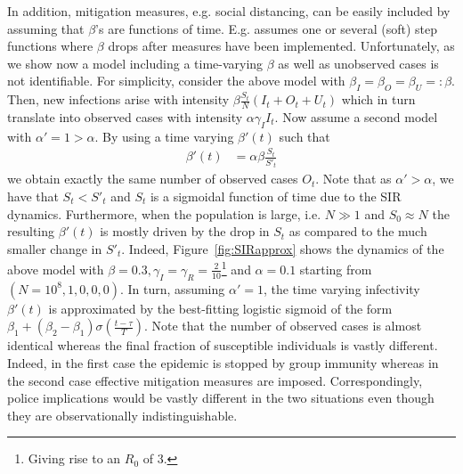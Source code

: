 \documentclass[fullpage,a4paper]{article}
\newcommand{\fig}[1]{Figure~\ref{fig:#1}}
\begin{document}
In addition, mitigation measures, e.g. social distancing, can be
easily included by assuming that $\beta$'s are functions of
time. E.g. \cite{arxiv:2004.01105} assumes one or several (soft) step
functions where $\beta$ drops after measures have been
implemented. Unfortunately, as we show now a model including a
time-varying $\beta$ as well as unobserved cases is not identifiable.
For simplicity, consider the above model with $\beta_I = \beta_O =
\beta_U =: \beta$. Then, new infections arise with intensity $\beta
\frac{S_t}{N} (I_t + O_t + U_t)$ which in turn translate into observed
cases with intensity $\alpha \gamma_I I_t$. Now assume a second model
with $\alpha' = 1 > \alpha$. By using a time varying $\beta'(t)$
such that
\begin{align*}
  \beta'(t) &= \alpha \beta \frac{S_t}{S'_t}
\end{align*}
we obtain exactly the same number of observed cases $O_t$. Note that
as $\alpha' > \alpha$, we have that $S_t < S'_t$ and $S_t$ is a
sigmoidal function of time due to the SIR dynamics. Furthermore, when
the population is large, i.e. $N \gg 1$ and $S_0 \approx N$ the
resulting $\beta'(t)$ is mostly driven by the drop in $S_t$ as
compared to the much smaller change in $S'_t$. Indeed, \fig{SIRapprox}
shows the dynamics of the above model with $\beta = 0.3, \gamma_I =
\gamma_R = \frac{2}{10}$\footnote{Giving rise to an $R_0$ of $3$.} and
$\alpha = 0.1$ starting from $(N = 10^8, 1, 0, 0, 0)$. In turn,
assuming $\alpha' = 1$, the time varying infectivity $\beta'(t)$ is
approximated by the best-fitting logistic sigmoid of the form $\beta_1
+ (\beta_2 - \beta_1) \sigma(\frac{t - \tau}{T})$. Note that the
number of observed cases is almost identical whereas the final
fraction of susceptible individuals is vastly different. Indeed, in
the first case the epidemic is stopped by group immunity whereas in
the second case effective mitigation measures are
imposed. Correspondingly, police implications would be vastly
different in the two situations even though they are observationally
indistinguishable.
\end{document}
